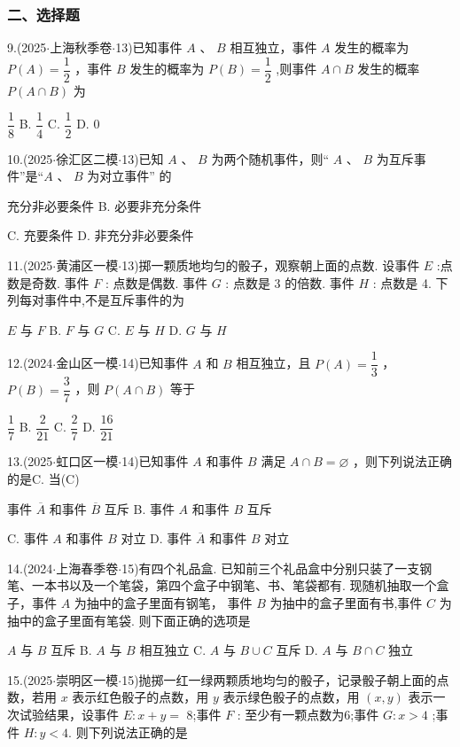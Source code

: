 \subsubsection*{二、选择题}

9.(2025$\cdot$上海秋季卷$\cdot$13)已知事件 $A$ 、 $B$ 相互独立，事件 $A$ 发生的概率为 $P\left( A\right)  = \dfrac{1}{2}$ ，事件 $B$ 发生的概率为 $P\left( B\right)  = \dfrac{1}{2}$ ,则事件 $A \cap  B$ 发生的概率 $P\left( {A \cap  B}\right)$ 为 \dotfill{(\kh{})}

\xx{}{}{}{}$\dfrac{1}{8}$ B. $\dfrac{1}{4}$ C. $\dfrac{1}{2}$ D. 0

10.(2025$\cdot$徐汇区二模$\cdot$13)已知 $A$ 、 $B$ 为两个随机事件，则“ $A$ 、 $B$ 为互斥事件”是“$A$ 、 $B$ 为对立事件” 的 \dotfill{(\kh{})}

\xx{}{}{}{}充分非必要条件 B. 必要非充分条件

C. 充要条件 D. 非充分非必要条件

11.(2025$\cdot$黄浦区一模$\cdot$13)掷一颗质地均匀的骰子，观察朝上面的点数. 设事件 $E$ :点数是奇数. 事件 $F$ : 点数是偶数. 事件 $G$ : 点数是 3 的倍数. 事件 $H$ : 点数是 4. 下列每对事件中,不是互斥事件的为\dotfill{(\kh{})}

\xx{}{}{}{}$E$ 与 $F$ B. $F$ 与 $G$ C. $E$ 与 $H$ D. $G$ 与 $H$

12.(2024$\cdot$金山区一模$\cdot$14)已知事件 $A$ 和 $B$ 相互独立，且 $P\left( A\right)  = \dfrac{1}{3}$ ， $P\left( B\right)  = \dfrac{3}{7}$ ，则 $P\left( {A \cap  B}\right)$ 等于 \dotfill{(\kh{})}

\xx{}{}{}{}$\dfrac{1}{7}$ B. $\dfrac{2}{21}$ C. $\dfrac{2}{7}$ D. $\dfrac{16}{21}$

13.(2025$\cdot$虹口区一模$\cdot$14)已知事件 $A$ 和事件 $B$ 满足 $A \cap  B = \varnothing$ ，则下列说法正确的是\blkda[2]{}C. 当(C)

\xx{}{}{}{}事件 $\overline{A}$ 和事件 $\overline{B}$ 互斥 B. 事件 $A$ 和事件 $B$ 互斥

C. 事件 $A$ 和事件 $B$ 对立 D. 事件 $\overline{A}$ 和事件 $B$ 对立

14.(2024$\cdot$上海春季卷$\cdot$15)有四个礼品盒. 已知前三个礼品盒中分别只装了一支钢笔、一本书以及一个笔袋，第四个盒子中钢笔、书、笔袋都有. 现随机抽取一个盒子，事件 $A$ 为抽中的盒子里面有钢笔， 事件 $B$ 为抽中的盒子里面有书,事件 $C$ 为抽中的盒子里面有笔袋. 则下面正确的选项是\dotfill{(\kh{})}

\xx{}{}{}{}$A$ 与 $B$ 互斥 B. $A$ 与 $B$ 相互独立 C. $A$ 与 $B \cup  C$ 互斥 D. $A$ 与 $B \cap  C$ 独立

15.(2025$\cdot$崇明区一模$\cdot$15)抛掷一红一绿两颗质地均匀的骰子，记录骰子朝上面的点数，若用 $x$ 表示红色骰子的点数，用 $y$ 表示绿色骰子的点数，用 $\left( {x,y}\right)$ 表示一次试验结果，设事件 $E : x + y =$ 8;事件 $F$ : 至少有一颗点数为6;事件 $G : x > 4$ ;事件 $H : y < 4$. 则下列说法正确的是 \dotfill{(\kh{})}

